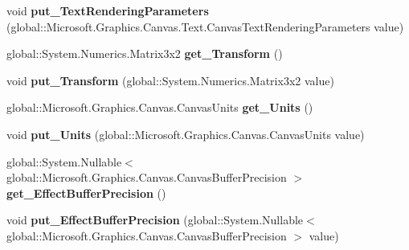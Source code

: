 \begin{DoxyCompactItemize}
void {\bfseries put\+\_\+\+Text\+Rendering\+Parameters} (global\+::\+Microsoft.\+Graphics.\+Canvas.\+Text.\+Canvas\+Text\+Rendering\+Parameters value)
\item 
\mbox{\label{class_microsoft_1_1_graphics_1_1_canvas_1_1_canvas_drawing_session_a9a70127628e9bd7cf6376f00aec663e4}} 
global\+::\+System.\+Numerics.\+Matrix3x2 {\bfseries get\+\_\+\+Transform} ()
\item 
\mbox{\label{class_microsoft_1_1_graphics_1_1_canvas_1_1_canvas_drawing_session_a7b5b08f163e7d4ae34e9fb705549248a}} 
void {\bfseries put\+\_\+\+Transform} (global\+::\+System.\+Numerics.\+Matrix3x2 value)
\item 
\mbox{\label{class_microsoft_1_1_graphics_1_1_canvas_1_1_canvas_drawing_session_a119604ae2b5fd9e7f79d46ddd93313d2}} 
global\+::\+Microsoft.\+Graphics.\+Canvas.\+Canvas\+Units {\bfseries get\+\_\+\+Units} ()
\item 
\mbox{\label{class_microsoft_1_1_graphics_1_1_canvas_1_1_canvas_drawing_session_aaa91afaef20786d41f0eb866b8b765dc}} 
void {\bfseries put\+\_\+\+Units} (global\+::\+Microsoft.\+Graphics.\+Canvas.\+Canvas\+Units value)
\item 
\mbox{\label{class_microsoft_1_1_graphics_1_1_canvas_1_1_canvas_drawing_session_a1078ad1f0fd9c95f4515e93a900a2545}} 
global\+::\+System.\+Nullable$<$ global\+::\+Microsoft.\+Graphics.\+Canvas.\+Canvas\+Buffer\+Precision $>$ {\bfseries get\+\_\+\+Effect\+Buffer\+Precision} ()
\item 
\mbox{\label{class_microsoft_1_1_graphics_1_1_canvas_1_1_canvas_drawing_session_a55b04c88b87788ac26038414a232e600}} 
void {\bfseries put\+\_\+\+Effect\+Buffer\+Precision} (global\+::\+System.\+Nullable$<$ global\+::\+Microsoft.\+Graphics.\+Canvas.\+Canvas\+Buffer\+Precision $>$ value)
\item 
\mbox{\label{class_microsoft_1_1_graphics_1_1_canvas_1_1_canvas_drawing_session_ab0590c3420906f6653193441dacb0930}} 

\end{DoxyCompactItemize}
